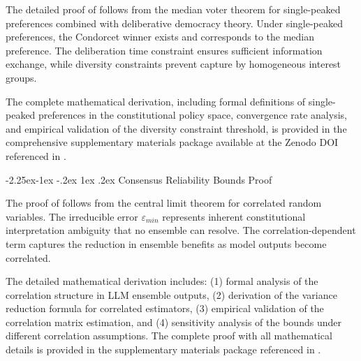 \documentclass[manuscript,screen,9pt]{acmart}
\makeatletter
\renewcommand\subsection{\@startsection{subsection}{2}{\z@}%
  {-2.25ex\@plus -1ex \@minus -.2ex}%
  {1ex \@plus .2ex}%
  {\normalfont\large\bfseries}}
\makeatother
\begin{document}
The detailed proof of  follows from the median voter theorem for single-peaked preferences combined with deliberative democracy theory. Under single-peaked preferences, the Condorcet winner exists and corresponds to the median preference. The deliberation time constraint ensures sufficient information exchange, while diversity constraints prevent capture by homogeneous interest groups.

The complete mathematical derivation, including formal definitions of single-peaked preferences in the constitutional policy space, convergence rate analysis, and empirical validation of the diversity constraint threshold, is provided in the comprehensive supplementary materials package available at the Zenodo DOI referenced in .

\subsection{Consensus Reliability Bounds Proof}
\label{app:consensus_bounds_proof}

The proof of  follows from the central limit theorem for correlated random variables. The irreducible error $\varepsilon_{min}$ represents inherent constitutional interpretation ambiguity that no ensemble can resolve. The correlation-dependent term captures the reduction in ensemble benefits as model outputs become correlated.

The detailed mathematical derivation includes: (1) formal analysis of the correlation structure in LLM ensemble outputs, (2) derivation of the variance reduction formula for correlated estimators, (3) empirical validation of the correlation matrix estimation, and (4) sensitivity analysis of the bounds under different correlation assumptions. The complete proof with all mathematical details is provided in the supplementary materials package referenced in .
\end{document}
